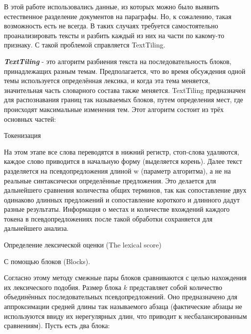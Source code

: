 \documentclass[12pt]{article}
\begin{document}
В этой работе использовались данные, из которых можно было выявить естественное разделение документов на параграфы. Но, к сожалению, такая возможность есть не всегда. В таких случаях требуется самостоятельно проанализировать тексты и разбить каждый из них на части по какому-то признаку. С такой проблемой справляется TextTiling.

\textbf{\textit{TextTiling}} - это алгоритм разбиения текста на последовательность блоков, принадлежащих разным темам. Предполагается, что во время обсуждения одной темы используется определённая лексика, и когда эта тема меняется, значительная часть словарного состава также меняется. TextTiling предназначен для распознавания границ так называемых блоков, путем определения мест, где происходят максимальные изменения тем.
Этот алгоритм состоит из трёх основных частей:
\par\begin{enumerate}{
		\vspace{0.2cm}\item Токенизация
		
		На этом этапе все слова переводятся в нижний регистр, стоп-слова удаляются, каждое слово приводится в начальную форму (выделяется корень). Далее текст разделяется на псевдопредложения длиной w (параметр алгоритма), а не на реальные синтаксически определённые предложения. Это делается для дальнейшего сравнения количества общих терминов, так как сопоставление двух одинаково длинных предложений и сопоставление короткого и длинного дадут разные результаты. Информация о местах и количестве вхождений каждого токена в псевдопредложениях после такой обработки сохраняется для дальнейшего анализа.
		
		\vspace{0.2cm}\item Определение лексической оценки (The lexical score)
		
		\par\begin{itemize}{
				\item С помощью блоков (Blocks).
				
				Согласно этому методу смежные пары блоков сравниваются с целью нахождения их лексического подобия. Размер блока $k$ представляет собой количество объединённых последовательных псевдопредложений. Оно предназначено для аппроксимации средней длины так называемого абзаца (фактические абзацы не используются ввиду их нерегулярных длин, что приводит к несбалансированным сравнениям). Пусть есть два блока:
				
}
\end{itemize}}
\end{enumerate}
\end{document}
